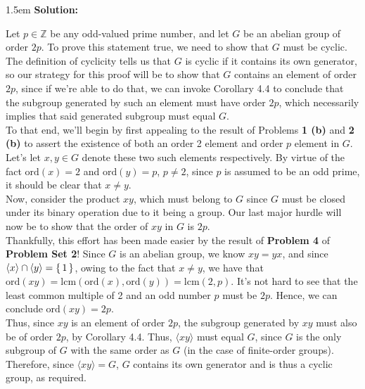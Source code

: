 \documentclass{article}
\newenvironment{solution}{
	\vspace{.5em}
	\par
	\begin{adjustwidth}{1.5em}{}
	\textbf{{Solution:}}
	\par
	\vspace{.5em}
}{
	\vspace{1em}
	\end{adjustwidth}
	\setcounter{step}{0}
	\newpage
}
\newcounter{step}
\newcommand{\ord}[1]{\text{ord}({#1})}
\newcommand{\gen}[1]{\langle {#1} \rangle}
\newcommand{\lcm}[2]{\text{lcm}({#1}, {#2})}
\begin{document}
\begin{solution}
	Let $p \in \mathbb{Z}$ be any odd-valued prime number, and let $G$ be an abelian group of order $2p$. To prove this statement true, we need to show that $G$ must be cyclic. The definition of cyclicity tells us that $G$ is cyclic if it contains its own generator, so our strategy for this proof will be to show that $G$ contains an element of order $2p$, since if we're able to do that, we can invoke Corollary 4.4 to conclude that the subgroup generated by such an element must have order $2p$, which necessarily implies that said generated subgroup must equal $G$. \\

	To that end, we'll begin by first appealing to the result of Problems \textbf{1 (b)} and \textbf{2 (b)} to assert the existence of both an order 2 element and order $p$ element in $G$. Let's let $x, y \in G$ denote these two such elements respectively. By virtue of the fact $\ord{x} = 2$ and $\ord{y} = p$, $p \neq 2$, since $p$ is assumed to be an odd prime, it should be clear that $x \neq y$. \\

	Now, consider the product $xy$, which must belong to $G$ since $G$ must be closed under its binary operation due to it being a group. Our last major hurdle will now be to show that the order of $xy$ in $G$ is $2p$. \\

	Thankfully, this effort has been made easier by the result of \textbf{Problem 4} of \textbf{Problem Set 2}! Since $G$ is an abelian group, we know $xy = yx$, and since $\gen{x} \cap \gen{y} = \set{1}$, owing to the fact that $x \neq y$, we have that $\ord{xy} = \lcm{\ord{x}}{\ord{y}} = \lcm{2}{p}$. It's not hard to see that the least common multiple of 2 and an odd number $p$ must be $2p$. Hence, we can conclude $\ord{xy} = 2p$. \\

	Thus, since $xy$ is an element of order $2p$, the subgroup generated by $xy$ must also be of order $2p$, by Corollary 4.4. Thus, $\gen{xy}$ must equal $G$, since $G$ is the only subgroup of $G$ with the same order as $G$ (in the case of finite-order groups). Therefore, since $\gen{xy} = G$, $G$ contains its own generator and is thus a cyclic group, as required.
\end{solution}
\end{document}
